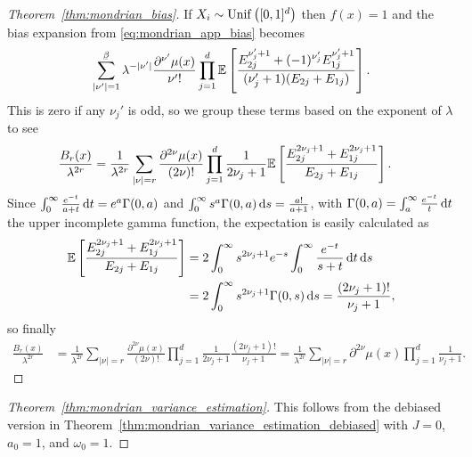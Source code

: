 \begin{proof}[Theorem~\ref{thm:mondrian_bias}]
  If $X_i \sim \operatorname{Unif}\big([0,1]^d\big)$ then $f(x) = 1$ and
  the bias expansion from \eqref{eq:mondrian_app_bias} becomes
  \begin{align*}
    \sum_{|\nu'|=1}^{\flbeta}
    \lambda^{- |\nu'|}
    \frac{\partial^{\nu'} \mu(x)}{\nu' !}
    \prod_{j=1}^d
    \E \left[
      \frac{E_{2j}^{\nu'_j + 1}
      + (-1)^{\nu'_j} E_{1j}^{\nu'_j + 1}}
      {(\nu'_j + 1) (E_{2j} + E_{1j})}
    \right].
  \end{align*}
  This is zero if any $\nu_j'$ is odd,
  so we group these terms based on the exponent of $\lambda$ to see
  \begin{align*}
    \frac{B_r(x)}{\lambda^{2r}}
    &=
    \frac{1}{\lambda^{2r}}
    \sum_{|\nu|=r}
    \frac{\partial^{2 \nu} \mu(x)}{(2 \nu) !}
    \prod_{j=1}^d
    \frac{1}{2\nu_j + 1}
    \mathbb{E} \left[
      \frac{E_{2j}^{2\nu_j + 1} + E_{1j}^{2\nu_j + 1}}
      {E_{2j} + E_{1j}}
    \right].
  \end{align*}
  Since $\int_0^\infty \frac{e^{-t}}{a+t} \,\mathrm{d}t = e^a \Gamma(0,a)$
  and $\int_0^\infty s^a \Gamma(0, a) \,\mathrm{d}s = \frac{a!}{a+1}$,
  with $\Gamma(0, a) = \int_a^\infty \frac{e^{-t}}{t} \,\mathrm{d}t$
  the upper incomplete gamma function,
  the expectation is easily calculated as
  \begin{align*}
    \mathbb{E} \left[
      \frac{E_{2j}^{2\nu_j + 1} + E_{1j}^{2\nu_j + 1}}
      {E_{2j} + E_{1j}}
    \right]
    &=
    2
    \int_{0}^{\infty}
    s^{2\nu_j + 1}
    e^{-s}
    \int_{0}^{\infty}
    \frac{e^{-t}}
    {s + t}
    \,\mathrm{d}t
    \,\mathrm{d}s \\
    &=
    2 \int_{0}^{\infty}
    s^{2\nu_j + 1}
    \Gamma(0, s)
    \,\mathrm{d}s
    =
    \frac{(2 \nu_j + 1)!}{\nu_j + 1},
  \end{align*}
  so finally
  \begin{align*}
    \frac{B_r(x)}{\lambda^{2r}}
    &=
    \frac{1}{\lambda^{2r}}
    \sum_{|\nu|=r}
    \frac{\partial^{2 \nu} \mu(x)}{(2 \nu) !}
    \prod_{j=1}^d
    \frac{1}{2\nu_j + 1}
    \frac{(2 \nu_j + 1)!}{\nu_j + 1}
    =
    \frac{1}{\lambda^{2r}}
    \sum_{|\nu|=r}
    \partial^{2 \nu} \mu(x)
    \prod_{j=1}^d
    \frac{1}{\nu_j + 1}.
  \end{align*}
\end{proof}

\begin{proof}[Theorem~\ref{thm:mondrian_variance_estimation}]
  This follows from the debiased version in
  Theorem~\ref{thm:mondrian_variance_estimation_debiased}
  with $J=0$, $a_0 = 1$, and $\omega_0 = 1$.
\end{proof}

